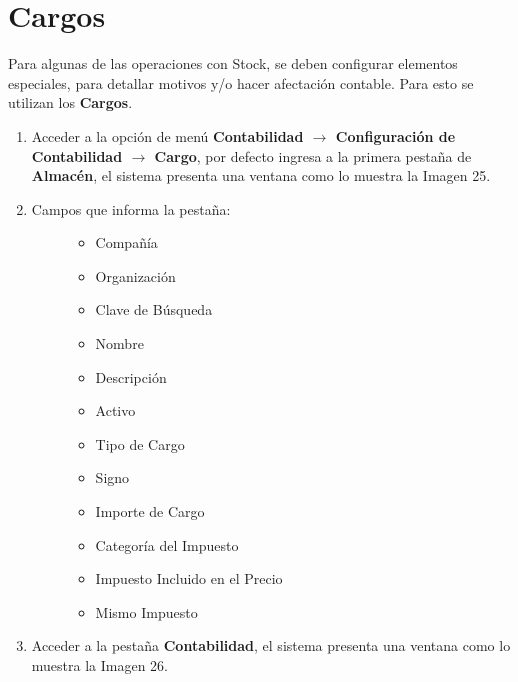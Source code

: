 \documentclass[letterpaper,10pt,spanish]{sphinxmanual}
\begin{document}
\section{Cargos}
\label{stock:cargos}
Para algunas de las operaciones con Stock, se deben configurar elementos especiales, para detallar motivos y/o hacer afectación contable. Para esto se utilizan los \textbf{Cargos}.
\begin{enumerate}
\item {} 
Acceder a la opción de menú \textbf{Contabilidad \(\rightarrow\) Configuración de Contabilidad \(\rightarrow\) Cargo}, por defecto ingresa a la primera pestaña de \textbf{Almacén}, el sistema presenta una ventana como lo muestra la Imagen 25.

\item {} \begin{description}
\item[{Campos que informa la pestaña:}] \leavevmode\begin{itemize}
\item {} 
Compañía

\item {} 
Organización

\item {} 
Clave de Búsqueda

\item {} 
Nombre

\item {} 
Descripción

\item {} 
Activo

\item {} 
Tipo de Cargo

\item {} 
Signo

\item {} 
Importe de Cargo

\item {} 
Categoría del Impuesto

\item {} 
Impuesto Incluido en el Precio

\item {} 
Mismo Impuesto

\end{itemize}

\end{description}

\item {} 
Acceder a la pestaña \textbf{Contabilidad}, el sistema presenta una ventana como lo muestra la Imagen 26.


\end{enumerate}
\end{document}
